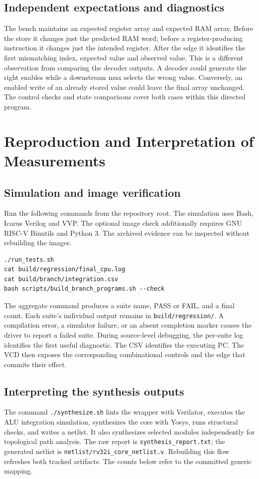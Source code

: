 \documentclass[conference,letterpaper]{IEEEtran}
\begin{document}
\subsection{Independent expectations and diagnostics}
The bench maintains an expected register array and expected RAM array. Before the store it changes just the predicted RAM word; before a register-producing instruction it changes just the intended register. After the edge it identifies the first mismatching index, expected value and observed value. This is a different observation from comparing the decoder outputs. A decoder could generate the right enables while a downstream mux selects the wrong value. Conversely, an enabled write of an already stored value could leave the final array unchanged. The control checks and state comparisons cover both cases within this directed program.

\clearpage
\section{Reproduction and Interpretation of Measurements}\label{app:repro}
\subsection{Simulation and image verification}
Run the following commands from the repository root. The simulation uses Bash, Icarus Verilog and VVP. The optional image check additionally requires GNU RISC-V Binutils and Python 3. The archived evidence can be inspected without rebuilding the images.
\begin{verbatim}
./run_tests.sh
cat build/regression/final_cpu.log
cat build/branch/integration.csv
bash scripts/build_branch_programs.sh --check
\end{verbatim}
The aggregate command produces a suite name, PASS or FAIL, and a final count. Each suite's individual output remains in \texttt{build/regression/}. A compilation error, a simulator failure, or an absent completion marker causes the driver to report a failed suite. During source-level debugging, the per-suite log identifies the first useful diagnostic. The CSV identifies the executing PC. The VCD then exposes the corresponding combinational controls and the edge that commits their effect.

\subsection{Interpreting the synthesis outputs}
The command \texttt{./synthesize.sh} lints the wrapper with Verilator, executes the ALU integration simulation, synthesizes the core with Yosys, runs structural checks, and writes a netlist. It also synthesizes selected modules independently for topological path analysis. The raw report is \texttt{synthesis\_report.txt}; the generated netlist is \texttt{netlist/rv32i\_core\_netlist.v}. Rebuilding this flow refreshes both tracked artifacts. The counts below refer to the committed generic mapping.
\end{document}
